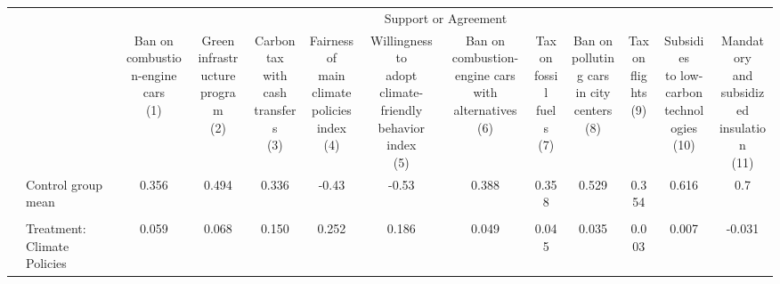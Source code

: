 \begin{tabular}[t]{llccccccccccc}
\toprule
\toprule
\multicolumn{1}{c}{} & \multicolumn{1}{c}{} & \multicolumn{11}{c}{Support or Agreement} \\
\cmidrule(l{3pt}r{3pt}){3-13}
  &   & \makecell{Ban on\\combustion-engine\\cars\\(1)} & \makecell{Green\\infrastructure\\program\\(2)} & \makecell{Carbon tax\\with\\cash transfers\\(3)} & \makecell{Fairness of\\main climate\\policies index\\(4)} & \makecell{Willingness to\\adopt climate-friendly\\behavior index\\(5)} & \makecell{Ban on\\combustion-engine cars\\with alternatives\\(6)} & \makecell{Tax on\\fossil\\fuels\\(7)} & \makecell{Ban on\\polluting cars\\in city centers\\(8)} & \makecell{Tax\\on\\flights\\(9)} & \makecell{Subsidies\\to low-carbon\\technologies\\(10)} & \makecell{Mandatory\\and subsidized\\insulation\\(11)}\\
\midrule
 & Control group mean & 0.356 & 0.494 & 0.336 & -0.43 & -0.53 & 0.388 & 0.358 & 0.529 & 0.354 & 0.616 & 0.7\\
 &  &  &  &  &  &  &  &  &  &  &  & \\
 & Treatment: Climate Policies & 0.059 & 0.068 & 0.150 & 0.252 & 0.186 & 0.049 & 0.045 & 0.035 & 0.003 & 0.007 & -0.031\\

\end{tabular}
